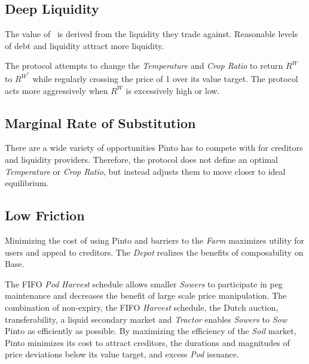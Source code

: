 \documentclass[tikz]{article}
\newcommand{\term}[1]{\textsl{#1}}
\newcommand{\Pinto}{} %
\begin{document}

\vspace{0.1cm}
\subsection{Deep Liquidity}
\vspace{0.1cm}

The value of \Pinto\ is derived from the liquidity they trade against. Reasonable levels of debt and liquidity attract more liquidity. 

\vspace{0.1cm}

The protocol attempts to change the \term{Temperature} and \term{Crop Ratio} to return $R^{W}$ to $R^{W^{*}}$ while regularly crossing the price of \Pinto1 over its value target. The protocol acts more aggressively when $R^{W}$ is excessively high or low.

\newpage


\subsection{Marginal Rate of Substitution}

There are a wide variety of opportunities Pinto has to compete with for creditors and liquidity providers. Therefore, the protocol does not define an optimal \term{Temperature} or \term{Crop Ratio}, but instead adjusts them to move closer to ideal equilibrium. 


\subsection{Low Friction}

Minimizing the cost of using Pinto and barriers to the \term{Farm} maximizes utility for users and appeal to creditors. The \term{Depot} realizes the benefits of composability on Base.

The FIFO \term{Pod} \term{Harvest} schedule allows smaller \term{Sowers} to participate in peg maintenance and decreases the benefit of large scale price manipulation. The combination of non-expiry, the FIFO \term{Harvest} schedule, the Dutch auction, transferability, a liquid secondary market and \term{Tractor} enables \term{Sowers} to \term{Sow} Pinto as efficiently as possible. By maximizing the efficiency of the \term{Soil} market, Pinto minimizes its cost to attract creditors, the durations and magnitudes of price deviations below its value target, and excess \term{Pod} issuance.
\end{document}
